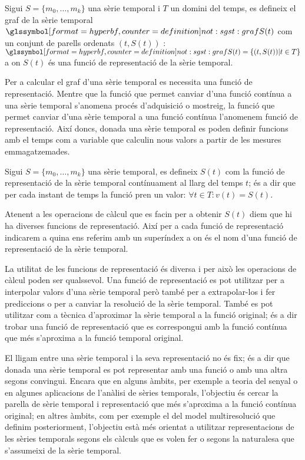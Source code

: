 \begin{definition}%
  Sigui $S=\{m_0,\ldots,m_k\}$ una sèrie temporal i $T$ un domini del
  temps, es defineix el graf de la sèrie temporal
  $\glssymboldef{not:sgst:graf} S(t)$ com un conjunt de parells
  ordenats $(t,S(t))$ : $\glssymboldef{not:sgst:graf} S(t) = \{ (t,S(t)) |
  t\in T \}$ a on $S(t)$ és una funció de representació de la sèrie
  temporal.
\end{definition}

Per a calcular el graf d'una sèrie temporal es necessita una funció de
representació. Mentre que la funció que permet canviar d'una funció
contínua a una sèrie temporal s'anomena procés d'adquisició o
mostreig, la funció que permet canviar d'una sèrie temporal a una
funció contínua l'anomenem funció de representació.  Així doncs,
donada una sèrie temporal es poden definir funcions amb el temps com a
variable que calculin nous valors a partir de les mesures
emmagatzemades.
\begin{definition}
  \label{def:model:frepr}
  Sigui $S=\{m_0,\ldots,m_k\}$ una sèrie temporal, es defineix $S(t)$
  com la funció de representació de la sèrie temporal contínuament al
  llarg del temps $t$; és a dir que per cada instant de temps la
  funció pren un valor: $\forall t\in T: v(t) = S(t)$. 

  Atenent a les operacions de càlcul que es facin per a obtenir $S(t)$
  diem que hi ha diverses funcions de representació. Així per a cada
  funció de representació indicarem a quina ens referim amb un
  superíndex  a on
   és el nom d'una funció de representació
  de la sèrie temporal.
\end{definition}

La utilitat de les funcions de representació és diversa i per això les
operacions de càlcul poden ser qualssevol. Una funció de representació
es pot utilitzar per a interpolar valors d'una sèrie temporal però
també per a extrapolar-los i fer prediccions o per a canviar la
resolució de la sèrie temporal. També es pot utilitzar com a tècnica
d'aproximar la sèrie temporal a la funció original; és a dir trobar
una funció de representació que es correspongui amb la funció contínua
que més s'aproxima a la funció temporal original.


El lligam entre una sèrie temporal i la seva representació no és fix;
és a dir que donada una sèrie temporal es pot representar amb una
funció o amb una altra segons convingui.  Encara que en alguns àmbits,
per exemple a teoria del senyal o en algunes aplicacions de l'anàlisi
de sèries temporals, l'objectiu és cercar la parella de sèrie temporal
i representació que més s'aproxima a la funció contínua original; en
altres àmbits, com per exemple el del model multiresolució que definim
posteriorment, l'objectiu està més orientat a utilitzar
representacions de les sèries temporals segons els càlculs que es
volen fer o segons la naturalesa que s'assumeixi de la sèrie temporal.


